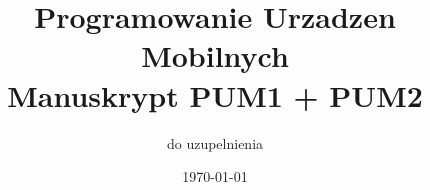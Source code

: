 \documentclass[12pt,a4paper]{book}
\begin{document}
\frontmatter
\title{Programowanie Urzadzen Mobilnych\\Manuskrypt PUM1 + PUM2}
\author{do uzupelnienia}
\date{\today}
\maketitle

\tableofcontents

\mainmatter
































\backmatter
\printbibliography
\end{document}

